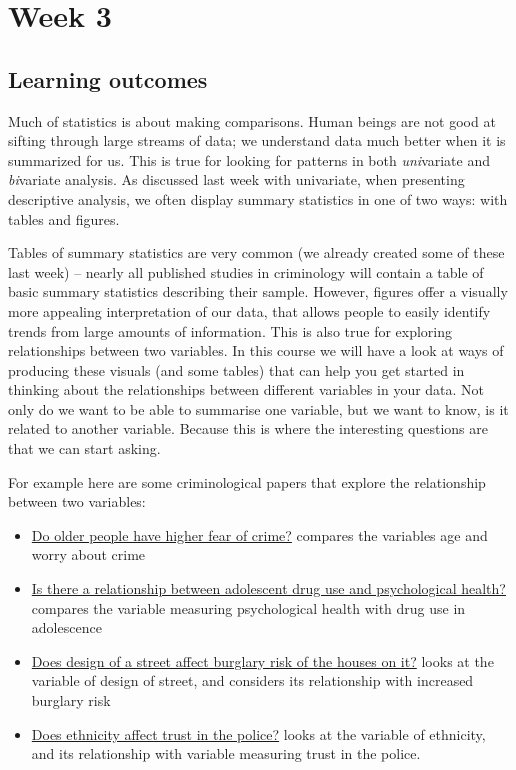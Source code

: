 \documentclass[
]{book}
\providecommand{\tightlist}{%
  \setlength{\itemsep}{0pt}\setlength{\parskip}{0pt}}
\begin{document}
\hypertarget{week3}{%
\chapter{Week 3}\label{week3}}

\hypertarget{learning-outcomes-2}{%
\section{Learning outcomes}\label{learning-outcomes-2}}

Much of statistics is about making comparisons. Human beings are not good at sifting through large streams of data; we understand data much better when it is summarized for us. This is true for looking for patterns in both \emph{uni}variate and \emph{bi}variate analysis. As discussed last week with univariate, when presenting descriptive analysis, we often display summary statistics in one of two ways: with tables and figures.

Tables of summary statistics are very common (we already created some of these last week) -- nearly all published studies in criminology will contain a table of basic summary statistics describing their sample. However, figures offer a visually more appealing interpretation of our data, that allows people to easily identify trends from large amounts of information. This is also true for exploring relationships between two variables. In this course we will have a look at ways of producing these visuals (and some tables) that can help you get started in thinking about the relationships between different variables in your data. Not only do we want to be able to summarise one variable, but we want to know, is it related to another variable. Because this is where the interesting questions are that we can start asking.

For example here are some criminological papers that explore the relationship between two variables:

\begin{itemize}
\tightlist
\item
  \href{http://onlinelibrary.wiley.com/doi/10.1111/j.1745-9125.1989.tb01051.x/full}{Do older people have higher fear of crime?} compares the variables age and worry about crime
\item
  \href{http://psycnet.apa.org/record/1990-22928-001}{Is there a relationship between adolescent drug use and psychological health?} compares the variable measuring psychological health with drug use in adolescence
\item
  \href{https://link.springer.com/article/10.1007/s10940-009-9084-8}{Does design of a street affect burglary risk of the houses on it?} looks at the variable of design of street, and considers its relationship with increased burglary risk
\item
  \href{http://journals.sagepub.com/doi/abs/10.1177/1098611104271105}{Does ethnicity affect trust in the police?} looks at the variable of ethnicity, and its relationship with variable measuring trust in the police.
\end{itemize}
\end{document}

